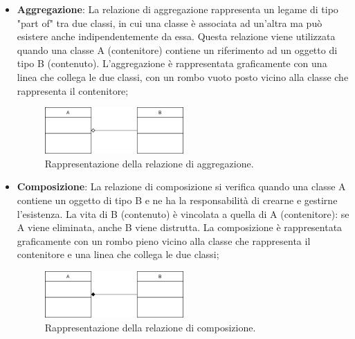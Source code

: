 \documentclass[10pt]{article}
\begin{document}
\begin{justify}
\begin{itemize}
            \item \textbf{Aggregazione}: La relazione di aggregazione rappresenta un legame di tipo "part of" tra due classi, in cui una classe è associata ad un'altra ma può esistere anche indipendentemente da essa. Questa relazione viene utilizzata quando una classe A (contenitore) contiene un riferimento ad un oggetto di tipo B (contenuto). L'aggregazione è rappresentata graficamente con una linea che collega le due classi, con un rombo vuoto posto vicino alla classe che rappresenta il contenitore;
            \begin{figure}[H]
            \centering
            \includegraphics[width=0.5\textwidth]{AggregazioneClasse.png}
            \caption{Rappresentazione della relazione di aggregazione.}
            \end{figure}

            \item \textbf{Composizione}: La relazione di composizione si verifica quando una classe A contiene un oggetto di tipo B e ne ha la responsabilità di crearne e gestirne l'esistenza. La vita di B (contenuto) è vincolata a quella di A (contenitore): se A viene eliminata, anche B viene distrutta. La composizione è rappresentata graficamente con un rombo pieno vicino alla classe che rappresenta il contenitore e una linea che collega le due classi;
            \begin{figure}[H]
            \centering
            \includegraphics[width=0.5\textwidth]{ComposizioneClasse.png}
            \caption{Rappresentazione della relazione di composizione.}
            \end{figure}


\end{itemize}
\end{justify}
\end{document}
